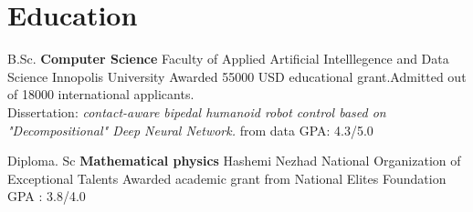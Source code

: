 \section{Education}
    \cventry{}
            {B.Sc. \textbf{Computer Science}}
            {Faculty of Applied Artificial Intelllegence and Data Science}
            {Innopolis University}
            {Awarded 55000 USD educational grant.Admitted out of 18000 international applicants.\\
            Dissertation: \textit{contact-aware bipedal humanoid robot control based on "Decompositional" Deep Neural Network.}
            from data}
            {GPA: 4.3/5.0} 
  
    \vspace{10pt}
    
    \cventry{}
            {Diploma. Sc \textbf{Mathematical physics}}
            {Hashemi Nezhad}
            {National Organization of Exceptional Talents}
            {Awarded academic grant from National Elites Foundation }
            {GPA : 3.8/4.0}